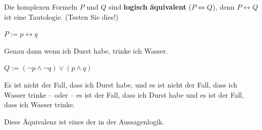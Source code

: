 \begin{frame}

Die komplexen Formeln $P$ und $Q$ sind \textbf{logisch äquivalent} ($P \Leftrightarrow Q$), denn $P \leftrightarrow Q$ ist eine Tautologie. (Testen Sie dies!)

\begin{exe}

	 $P := p \leftrightarrow q$
	
	Genau dann wenn ich Durst habe, trinke ich Wasser.
	
	 $Q := ( \lnot p \land \lnot q) \lor (p \land q)$
	
	Es ist nicht der Fall, dass ich Durst habe, und es ist nicht der Fall, dass ich Wasser trinke -- oder -- es ist der Fall, dass ich Durst habe und es ist der Fall, dass ich Wasser trinke.
\end{exe}
	
Diese Äquivalenz ist eines der  in der Aussagenlogik.

\end{frame}


